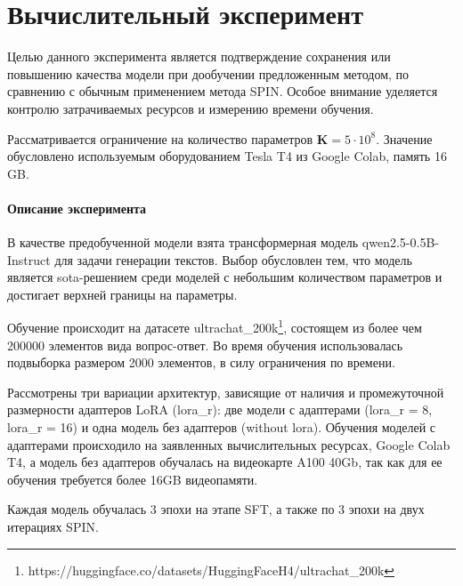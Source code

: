 \documentclass[12pt, twoside]{article}
\newcommand{\rightsource}[2]{\footnote{#2}\label{#1}}
\begin{document}
\vspace{10}

\section{Вычислительный эксперимент}

Целью данного эксперимента является подтверждение сохранения или повышению качества модели при дообучении предложенным методом, по сравнению с обычным применением метода SPIN. Особое внимание уделяется контролю затрачиваемых ресурсов и измерению времени обучения.

Рассматривается ограничение на количество параметров $\mathbf{K} = 5\cdot10^8$. Значение обусловлено используемым оборудованием Tesla T4 из Google Colab, память 16 GB. 

\paragraph{Описание эксперимента}
В качестве предобученной модели взята трансформерная модель qwen2.5-0.5B-Instruct \parencite{Yang2025} для задачи генерации текстов. Выбор обусловлен тем, что модель является sota-решением среди моделей с небольшим количеством параметров и достигает верхней границы на параметры.

Обучение происходит на датасете ultrachat\_200k\rightsource{}{https://huggingface.co/datasets/HuggingFaceH4/ultrachat\_200k}\supref{}, состоящем из более чем 200000 элементов вида вопрос-ответ. Во время обучения использовалась подвыборка размером 2000 элементов, в силу ограничения по времени.

Рассмотрены три вариации архитектур, зависящие от наличия и промежуточной размерности адаптеров LoRA (lora\_r): две модели с адаптерами (lora\_r = 8, lora\_r = 16) и одна модель без адаптеров (without lora). Обучения моделей с адаптерами происходило на заявленных вычислительных ресурсах, Google Colab T4, а модель без адаптеров обучалась на видеокарте A100 40Gb, так как для ее обучения требуется более 16GB видеопамяти. 

Каждая модель обучалась 3 эпохи на этапе SFT, а также по 3 эпохи на двух итерациях SPIN.
\end{document}
